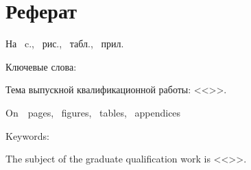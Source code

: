 \chapter*[Count-me]{Реферат} %
\thispagestyle{empty}%
%
%




На ~c.,
~{рис.},
~{табл.},
~{прил.}%



{Ключевые слова: \keywordsRu}

Тема выпускной квалификационной работы: <<\thesisTitle>>.


\abstractRu



\printTheAbstract %


On~~pages,
~figures,
~tables,
~appendices%

{Keywords: \keywordsEn} %
	
The subject of the graduate qualification work is <<\thesisTitleEn>>.
	
	
\abstractEn %
	


\thispagestyle{empty}
%
